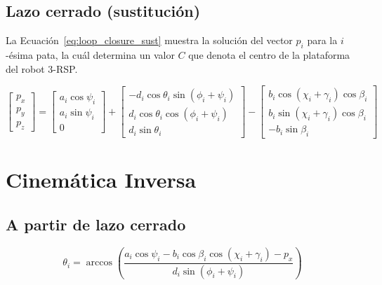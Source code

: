 \documentclass[titlepage, letterpaper, fleqn]{article}
\begin{document}

\subsection{Lazo cerrado (sustitución)} %
\label{sec:loop_closure_sust}

La Ecuación~\ref{eq:loop_closure_sust} muestra la solución del vector $p_i$ para la $i$-ésima pata,
la cuál determina un valor $C$ que denota el centro de la plataforma del robot 3-RSP.

\begin{equation}
    \label{eq:loop_closure_sust}
    \begin{bmatrix}
    p_x \\
    p_y \\
    p_z
    \end{bmatrix}
    =
    \begin{bmatrix}
    a_i\cos\psi_i \\
    a_i\sin\psi_i \\
    0
    \end{bmatrix}
    +
    \begin{bmatrix}
    -d_i \cos \theta_i \sin(\phi_i + \psi_i) \\
    d_i \cos \theta_i \cos(\phi_i + \psi_i) \\
    d_i \sin \theta_i
    \end{bmatrix}
    -
    \begin{bmatrix}
    b_i\cos(\chi_i + \gamma_i)\cos\beta_i \\
    b_i\sin(\chi_i + \gamma_i)\cos\beta_i \\
    -b_i \sin\beta_i
    \end{bmatrix}
\end{equation}


\section{Cinemática Inversa} %
\label{sec:inverse}

\subsection{A partir de lazo cerrado} %
\label{sec:closure-loop-inverse}

\begin{equation}
    \label{eq:theta_from_px}
    \theta_i = \arccos\left(\frac{a_i \cos\psi_i - b_i\cos\beta_i\cos(\chi_i + \gamma_i) - p_x}{d_i \sin(\phi_i + \psi_i)}\right)
\end{equation}
\end{document}
